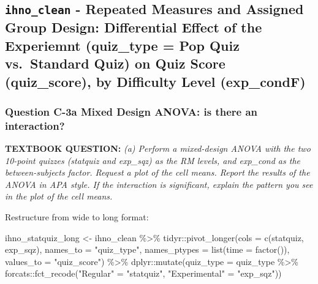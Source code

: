 \documentclass[
]{article}
\newenvironment{Shaded}{\begin{snugshade}}{\end{snugshade}}
\newcommand{\AttributeTok}[1]{\textcolor[rgb]{0.77,0.63,0.00}{#1}}
\newcommand{\FunctionTok}[1]{\textcolor[rgb]{0.00,0.00,0.00}{#1}}
\newcommand{\NormalTok}[1]{#1}
\newcommand{\OtherTok}[1]{\textcolor[rgb]{0.56,0.35,0.01}{#1}}
\newcommand{\SpecialCharTok}[1]{\textcolor[rgb]{0.00,0.00,0.00}{#1}}
\newcommand{\StringTok}[1]{\textcolor[rgb]{0.31,0.60,0.02}{#1}}
\begin{document}
\hypertarget{ihno_clean---repeated-measures-and-assigned-group-design-differential-effect-of-the-experiemnt-quiz_type-pop-quiz-vs.-standard-quiz-on-quiz-score-quiz_score-by-difficulty-level-exp_condf}{%
\subsection{\texorpdfstring{\texttt{ihno\_clean} - Repeated Measures and
Assigned Group Design: Differential Effect of the Experiemnt (quiz\_type
= Pop Quiz vs.~Standard Quiz) on Quiz Score (quiz\_score), by Difficulty
Level
(exp\_condF)}{ihno\_clean - Repeated Measures and Assigned Group Design: Differential Effect of the Experiemnt (quiz\_type = Pop Quiz vs.~Standard Quiz) on Quiz Score (quiz\_score), by Difficulty Level (exp\_condF)}}\label{ihno_clean---repeated-measures-and-assigned-group-design-differential-effect-of-the-experiemnt-quiz_type-pop-quiz-vs.-standard-quiz-on-quiz-score-quiz_score-by-difficulty-level-exp_condf}}

\hypertarget{question-c-3a-mixed-design-anova-is-there-an-interaction}{%
\subsubsection{Question C-3a Mixed Design ANOVA: is there an
interaction?}\label{question-c-3a-mixed-design-anova-is-there-an-interaction}}

\textbf{TEXTBOOK QUESTION:} \emph{(a) Perform a mixed-design ANOVA with
the two 10-point quizzes (statquiz and exp\_sqz) as the RM levels, and
exp\_cond as the between-subjects factor. Request a plot of the cell
means. Report the results of the ANOVA in APA style. If the interaction
is significant, explain the pattern you see in the plot of the cell
means.}

Restructure from wide to long format:

\begin{Shaded}
\begin{Highlighting}[]
\NormalTok{ihno\_statquiz\_long }\OtherTok{\textless{}{-}}\NormalTok{ ihno\_clean }\SpecialCharTok{\%\textgreater{}\%} 
\NormalTok{  tidyr}\SpecialCharTok{::}\FunctionTok{pivot\_longer}\NormalTok{(}\AttributeTok{cols =} \FunctionTok{c}\NormalTok{(statquiz, exp\_sqz),}
                      \AttributeTok{names\_to =} \StringTok{"quiz\_type"}\NormalTok{,}
                      \AttributeTok{names\_ptypes =} \FunctionTok{list}\NormalTok{(}\AttributeTok{time =} \FunctionTok{factor}\NormalTok{()),}
                      \AttributeTok{values\_to =} \StringTok{"quiz\_score"}\NormalTok{) }\SpecialCharTok{\%\textgreater{}\%} 
\NormalTok{  dplyr}\SpecialCharTok{::}\FunctionTok{mutate}\NormalTok{(}\AttributeTok{quiz\_type =}\NormalTok{ quiz\_type }\SpecialCharTok{\%\textgreater{}\%} 
\NormalTok{                  forcats}\SpecialCharTok{::}\FunctionTok{fct\_recode}\NormalTok{(}\StringTok{"Regular"} \OtherTok{=} \StringTok{"statquiz"}\NormalTok{,}
                                      \StringTok{"Experimental"} \OtherTok{=} \StringTok{"exp\_sqz"}\NormalTok{))}
\end{Highlighting}
\end{Shaded}
\end{document}
